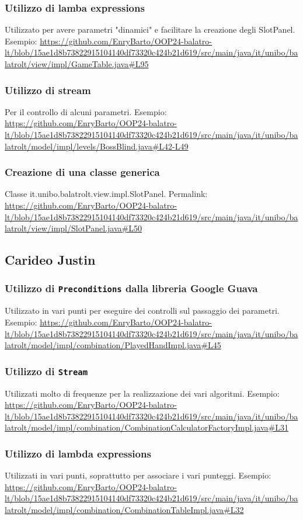 \documentclass[a4paper,12pt]{report}
\begin{document}
\subsubsection{Utilizzo di lamba expressions}
Utilizzato per avere parametri "dinamici" e facilitare la creazione degli SlotPanel. Esempio: \url{https://github.com/EnryBarto/OOP24-balatro-lt/blob/15ae1d8b73822915104140df73320c424b21d619/src/main/java/it/unibo/balatrolt/view/impl/GameTable.java#L95}
\subsubsection{Utilizzo di stream}
Per il controllo di alcuni parametri. Esempio: \url{https://github.com/EnryBarto/OOP24-balatro-lt/blob/15ae1d8b73822915104140df73320c424b21d619/src/main/java/it/unibo/balatrolt/model/impl/levels/BossBlind.java#L42-L49}
\subsubsection{Creazione di una classe generica}
Classe it.unibo.balatrolt.view.impl.SlotPanel. Permalink: \url{https://github.com/EnryBarto/OOP24-balatro-lt/blob/15ae1d8b73822915104140df73320c424b21d619/src/main/java/it/unibo/balatrolt/view/impl/SlotPanel.java#L50}

\subsection{Carideo Justin}
\subsubsection{Utilizzo di \texttt{Preconditions} dalla libreria Google Guava}
Utilizzato in vari punti per eseguire dei controlli sul passaggio dei parametri. Esempio: \url{https://github.com/EnryBarto/OOP24-balatro-lt/blob/15ae1d8b73822915104140df73320c424b21d619/src/main/java/it/unibo/balatrolt/model/impl/combination/PlayedHandImpl.java#L45}
\subsubsection{Utilizzo di \texttt{Stream}}
Utilizzati molto di frequenze per la realizzazione dei vari algoritmi. Esempio: \url{https://github.com/EnryBarto/OOP24-balatro-lt/blob/15ae1d8b73822915104140df73320c424b21d619/src/main/java/it/unibo/balatrolt/model/impl/combination/CombinationCalculatorFactoryImpl.java#L31}
\subsubsection{Utilizzo di lambda expressions}
Utilizzati in vari punti, soprattutto per associare i vari punteggi. Esempio: \url{https://github.com/EnryBarto/OOP24-balatro-lt/blob/15ae1d8b73822915104140df73320c424b21d619/src/main/java/it/unibo/balatrolt/model/impl/combination/CombinationTableImpl.java#L32}
\end{document}
